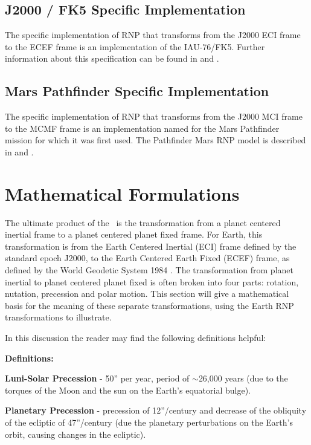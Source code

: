 \subsection{J2000 / FK5 Specific Implementation}

The specific implementation of RNP that transforms from the J2000 ECI frame
to the ECEF frame is an implementation of the IAU-76/FK5. Further information
about this specification can be found in \cite{Bond1} and \cite{ValladoThird}.

\subsection{Mars Pathfinder Specific Implementation}

The specific implementation of RNP that transforms from the J2000 MCI frame
to the MCMF frame is an implementation named for the Mars Pathfinder mission
for which it was first used. The Pathfinder Mars RNP model is described in
\cite{Konopliv06} and \cite{Konopliv10}.

\section{Mathematical Formulations}

The ultimate product of the \ModelDesc\ is the transformation from a
planet centered inertial frame to a planet centered planet fixed frame. For
Earth, this transformation is from the Earth Centered Inertial (ECI) frame
defined by the standard epoch J2000, to the Earth Centered Earth Fixed (ECEF)
frame, as defined by the World Geodetic System 1984 \cite{WGS84}. The
transformation from planet inertial to planet centered planet fixed is often
broken into four parts: rotation, nutation, precession and polar motion. This
section will give a mathematical basis for the meaning of these separate
transformations, using the Earth RNP transformations to illustrate.

In this discussion the reader may find the following definitions
helpful: 

\textbf{Definitions:}

\textbf{Luni-Solar Precession} - 50'' per year, period of $\sim $26,000 
years (due to the torques of the Moon and the sun on 
the Earth's equatorial bulge).

\textbf{Planetary Precession} - precession of 12''/century and 
decrease of the obliquity of the ecliptic of 47''/century 
(due the planetary perturbations on the Earth's orbit, 
causing changes in the ecliptic).


